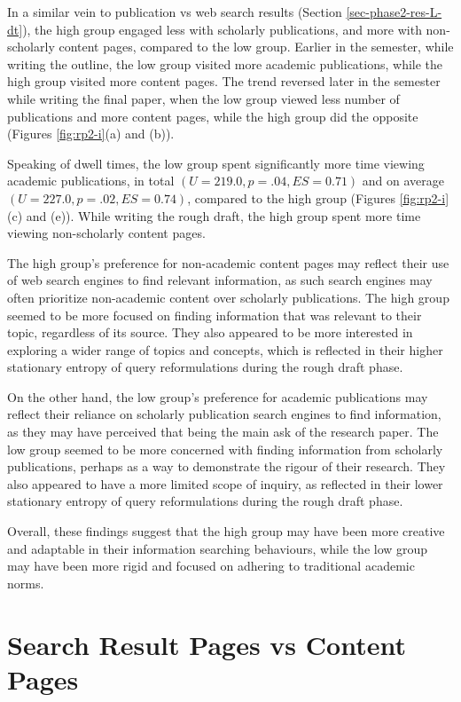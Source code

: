 \documentclass[letterpaper, nobind]{templates/ociamthesis}
\begin{document}
In a similar vein to publication vs web search results (Section \ref{sec-phase2-res-L-dt}), the high group engaged less with scholarly publications, and more with non-scholarly content pages, compared to the low group.
Earlier in the semester, while writing the outline, the low group visited more academic publications, while the high group visited more content pages.
The trend reversed later in the semester while writing the final paper, when the low group viewed less number of publications and more content pages, while the high group did the opposite (Figures \ref{fig:rp2-i}(a) and (b)).

Speaking of dwell times, the low group spent significantly more time viewing academic publications, in total \((U = 219.0, p = .04, ES = 0.71)\) and on average \((U = 227.0, p = .02, ES = 0.74)\), compared to the high group (Figures \ref{fig:rp2-i}(c) and (e)).
While writing the rough draft, the high group spent more time viewing non-scholarly content pages.

The high group's preference for non-academic content pages may reflect their use of web search engines to find relevant information, as such search engines may often prioritize non-academic content over scholarly publications.
The high group seemed to be more focused on finding information that was relevant to their topic, regardless of its source. They also appeared to be more interested in exploring a wider range of topics and concepts, which is reflected in their higher stationary entropy of query reformulations during the rough draft phase.

On the other hand, the low group's preference for academic publications may reflect their reliance on scholarly publication search engines to find information, as they may have perceived that being the main ask of the research paper.
The low group seemed to be more concerned with finding information from scholarly publications, perhaps as a way to demonstrate the rigour of their research.
They also appeared to have a more limited scope of inquiry, as reflected in their lower stationary entropy of query reformulations during the rough draft phase.

Overall, these findings suggest that the high group may have been more creative and adaptable in their information searching behaviours, while the low group may have been more rigid and focused on adhering to traditional academic norms.

\hypertarget{search-result-pages-vs-content-pages}{%
\section{Search Result Pages vs Content Pages}\label{search-result-pages-vs-content-pages}}
\end{document}
